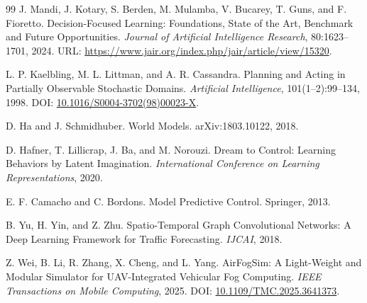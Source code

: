 \documentclass[letterpaper,journal]{IEEEtran}
\begin{document}
\begin{thebibliography}{99}
J. Mandi, J. Kotary, S. Berden, M. Mulamba, V. Bucarey, T. Guns, and F. Fioretto.
\newblock Decision-Focused Learning: Foundations, State of the Art, Benchmark and Future Opportunities.
\newblock \textit{Journal of Artificial Intelligence Research}, 80:1623--1701, 2024.
\newblock URL: \url{https://www.jair.org/index.php/jair/article/view/15320}.


L. P. Kaelbling, M. L. Littman, and A. R. Cassandra.
\newblock Planning and Acting in Partially Observable Stochastic Domains.
\newblock \textit{Artificial Intelligence}, 101(1--2):99--134, 1998.
\newblock DOI: \href{https://doi.org/10.1016/S0004-3702(98)00023-X}{10.1016/S0004-3702(98)00023-X}.

D. Ha and J. Schmidhuber.
\newblock World Models.
\newblock arXiv:1803.10122, 2018.

D. Hafner, T. Lillicrap, J. Ba, and M. Norouzi.
\newblock Dream to Control: Learning Behaviors by Latent Imagination.
\newblock \textit{International Conference on Learning Representations}, 2020.

E. F. Camacho and C. Bordons.
\newblock Model Predictive Control.
\newblock Springer, 2013.

B. Yu, H. Yin, and Z. Zhu.
\newblock Spatio-Temporal Graph Convolutional Networks: A Deep Learning Framework for Traffic Forecasting.
\newblock \textit{IJCAI}, 2018.

Z. Wei, B. Li, R. Zhang, X. Cheng, and L. Yang.
\newblock AirFogSim: A Light-Weight and Modular Simulator for UAV-Integrated Vehicular Fog Computing.
\newblock \textit{IEEE Transactions on Mobile Computing}, 2025.
\newblock DOI: \href{https://doi.org/10.1109/TMC.2025.3641373}{10.1109/TMC.2025.3641373}.

\end{thebibliography}
\end{document}
